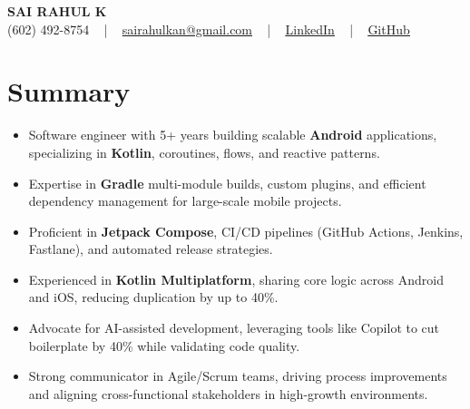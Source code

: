\documentclass[letterpaper,11pt]{article}
\newcommand{\resumeItem}[1]{
  \item\footnotesize{
    {#1 \vspace{-2pt}}
  }
}
\newcommand{\resumeItemListStart}{\begin{itemize}[leftmargin=*]}
\newcommand{\resumeItemListEnd}{\end{itemize}\vspace{-5pt}}
\begin{document}
\begin{center}
    {\fontsize{14pt}{12pt}\selectfont \textbf{\MakeUppercase{Sai Rahul K}}}\\ \vspace{2pt}
    \fontsize{10pt}{12pt}\selectfont (602) 492-8754 ~ | ~ \href{mailto:sairahulkan@gmail.com}{sairahulkan@gmail.com} ~ | ~
    \href{https://www.linkedin.com/in/rq123/}{\color{blue}\underline{LinkedIn}} ~ | ~
    \href{https://github.com/kanrahuldo}{\color{blue}\underline{GitHub}}~
    \vspace{-8pt}
\end{center}

\section{Summary}
\fontsize{9pt}{10pt}\selectfont
\resumeItemListStart
    \resumeItem{Software engineer with 5+ years building scalable \textbf{Android} applications, specializing in \textbf{Kotlin}, coroutines, flows, and reactive patterns.}
    \resumeItem{Expertise in \textbf{Gradle} multi-module builds, custom plugins, and efficient dependency management for large-scale mobile projects.}
    \resumeItem{Proficient in \textbf{Jetpack Compose}, CI/CD pipelines (GitHub Actions, Jenkins, Fastlane), and automated release strategies.}
    \resumeItem{Experienced in \textbf{Kotlin Multiplatform}, sharing core logic across Android and iOS, reducing duplication by up to 40\%.}
    \resumeItem{Advocate for AI-assisted development, leveraging tools like Copilot to cut boilerplate by 40\% while validating code quality.}
    \resumeItem{Strong communicator in Agile/Scrum teams, driving process improvements and aligning cross-functional stakeholders in high-growth environments.}
\resumeItemListEnd
\vspace{-6pt}
\end{document}

